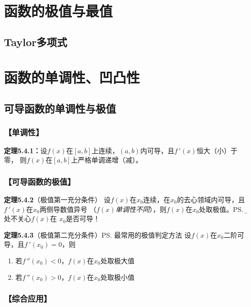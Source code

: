 \section{函数的极值与最值}





\subsection{Taylor多项式}





\section{函数的单调性、凹凸性}

\subsection{可导函数的单调性与极值}

\subsubsection{【单调性】}

{\bf 定理5.4.1：}设$f(x)$在$[a,b]$上连续，$(a,b)$内可导，且$f\,'(x)$恒大（小）于零，
则$f(x)$在$[a,b]$上严格单调递增（减）。



\subsubsection{【可导函数的极值】}

{\bf 定理5.4.2}（极值第一充分条件）
设$f(x)$在$x_0$连续，在$x_0$的去心领域内可导，且$f\,'(x)$在$x_0$两侧导数值异号
（{\it $f(x)$单调性不同}），则$f(x)$在$x_0$处取极值。\ps{\b 此处不关心$f(x)$在
$x_0$是否可导！}



{\bf 定理5.4.3}（极值第二充分条件）\ps{最常用的极值判定方法}
设$f(x)$在$x_0$二阶可导，且$f\,'(x_0)=0$，则
\begin{enumerate}[(1)]
  \setlength{\itemindent}{1cm}
  \item 若$f\,''(x_0)<0$，$f(x)$在$x_0$处取极大值 
  \item 若$f\,''(x_0)>0$，$f(x)$在$x_0$处取极小值
\end{enumerate}



\subsubsection{【综合应用】}





